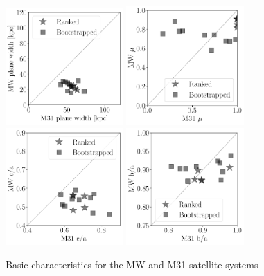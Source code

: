 \documentclass[a4paper,fleqn,usenatbib]{mnras}
\begin{document}
\begin{figure}
\centering
\includegraphics[width=0.40\textwidth]{LG_scatter_width.pdf}
\includegraphics[width=0.40\textwidth]{LG_scatter_mu.pdf}
\includegraphics[width=0.40\textwidth]{LG_scatter_ca_ratio.pdf}
\includegraphics[width=0.40\textwidth]{LG_scatter_ba_ratio.pdf}
\caption{Basic characteristics for the MW and M31 satellite systems
\label{fig:sampling}}
\end{figure}
\end{document}
